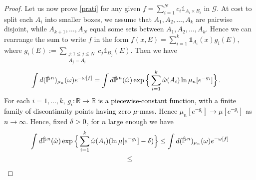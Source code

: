 \documentclass[12pt,a4paper,reqno]{amsart}
\newcommand{\cG}{\ensuremath{\mathcal G}}
\newcommand{\cS}{\ensuremath{\mathcal S}}
\newcommand{\bbP}{{\ensuremath{\mathbb P}} }
\newcommand{\bbR}{{\ensuremath{\mathbb R}} }
\newcommand{\rosso}{\textcolor{black}} %
\newcommand{\be}{\begin{equation}}
\newcommand{\en}{\end{equation}}
\newcommand{\pn}{\rosso{{\hat\bbP}^{\hspace{0.03cm}n}}}
\begin{document}
\begin{proof}
Let us now   prove \eqref{prati}
for any given $f=\sum_{i=1}^N c_i \mathds{1}_{A_i \times B_i}$ in $\cG$. At cost to split each  $A_i$ into smaller boxes, 
  we assume that $A_1,A_2, \dots, A_k$ are pairwise disjoint, while $A_{k+1},\dots, A_N$ equal some sets between $A_1,A_2, \dots, A_k$. Hence 
  we can rearrange the sum to write $f$ in  the form 
$
 f(x,E)=\sum_{i=1}^k \mathds{1}_{A_i}(x)  g_i(E)$, where $ g_i (E) := \sum _{\substack{j: 1\leq j \leq N\\
 A_j=A_i}} c_j \mathds{1}_{B_j} (E)$.
Then  we have 
\be\label{sole}
\begin{split}
 \int d(\pn)_{\mu_n} (\o) e^{- \o [f]} 
& =
 \int d \pn (\hat \o)\exp\Big\{ \sum_{i=1}^k \hat \o (A_i)  \ln \mu_n[ e^{-g_i}] \Big\}\,.
\end{split}
\en
For each $i=1,\dots, k$, \rosso{$g_i:\bbR\to \bbR$ is a piecewise-constant function, with a finite family of   discontinuity points having zero $\mu$-mass. Hence   $\mu_n [ e^{-g_i}]\to \mu[e^{-g_i}]$  as $n\to \infty$.} 
Hence, fixed $\delta>0$, for $n$ large enough we have
\begin{multline}\label{fulmini}
 \int d \pn (\hat \o)\exp\Big\{ \sum_{i=1}^k \hat \o (A_i)  (\ln \mu [ e^{-g_i}] -\d) \Big\}
\leq 
\int d(\pn)_{\mu_n} (\o) e^{- \o [f]} 
\\ \leq 

\end{multline}
\end{proof}
\end{document}
